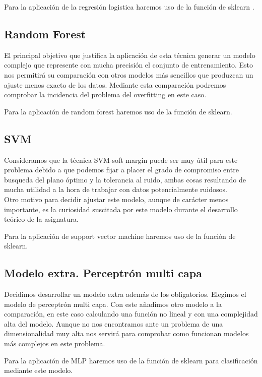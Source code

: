 \documentclass[11pt,a4paper]{article}
\begin{document}
Para la aplicación de la regresión logistica haremos uso de la función de sklearn\cite{LR} . 

\subsection{Random Forest}

El principal objetivo que justifica la aplicación de esta técnica generar un modelo complejo que represente con mucha precisión el conjunto de entrenamiento. Esto nos permitirá su comparación con otros modelos más sencillos que produzcan un ajuste menos exacto de los datos. Mediante esta comparación podremos comprobar la incidencia del problema del overfitting en este caso. 

Para la aplicación de random forest haremos uso de la función de sklearn\cite{RF}.

\subsection{SVM}

Consideramos que la técnica SVM-soft margin puede ser muy útil para este problema debido a que podemos fijar a placer el grado de compromiso entre busqueda del plano óptimo y la tolerancia al ruido, ambas cosas resultando de mucha utilidad a la hora de trabajar con datos potencialmente ruidosos.\\

Otro motivo para decidir ajustar este modelo, aunque de carácter menos importante, es la curiosidad suscitada por este modelo durante el desarrollo teórico de la asignatura. 

Para la aplicación de support vector machine haremos uso de la función de sklearn\cite{SVM}.

\subsection{Modelo extra. Perceptrón multi capa}
Decidimos desarrollar un modelo extra además de los obligatorios. Elegimos el modelo de perceptrón multi capa. Con este añadimos otro modelo a la comparación, en este caso calculando una función no lineal y con una complejidad alta del modelo. Aunque no nos encontramos ante un problema de una dimensionalidad muy alta nos servirá para comprobar como funcionan modelos más complejos en este problema.

Para la aplicación de MLP haremos uso de la función de sklearn\cite{MLP} para clasificación mediante este modelo.
\end{document}
